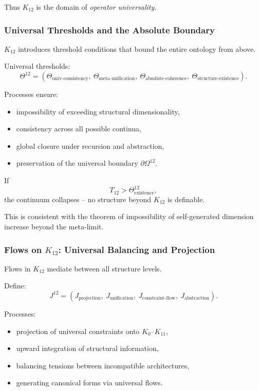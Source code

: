 Thus $K_{12}$ is the domain of \emph{operator universality}.

\subsubsection{Universal Thresholds and the Absolute Boundary}

$K_{12}$ introduces threshold conditions that bound
the entire ontology from above.

Universal thresholds:
\[
\Theta^{12} =
(\Theta_{\text{univ-consistency}},\
 \Theta_{\text{meta-unification}},\
 \Theta_{\text{absolute-coherence}},\
 \Theta_{\text{structure-existence}}).
\]

Processes ensure:
\begin{itemize}
    \item impossibility of exceeding structural dimensionality,
    \item consistency across all possible continua,
    \item global closure under recursion and abstraction,
    \item preservation of the universal boundary $\partial\Omega^{12}$.
\end{itemize}

If
\[
T_{12} > \Theta^{12}_{\text{existence}},
\]
the continuum collapses -- no structure beyond $K_{12}$ is definable.

This is consistent with the theorem of impossibility of
self-generated dimension increase beyond the meta-limit.

\subsubsection{Flows on $K_{12}$: Universal Balancing and Projection}

Flows in $K_{12}$ mediate between all structure levels.

Define:
\[
J^{12} =
(J_{\text{projection}},\ J_{\text{unification}},\
 J_{\text{constraint-flow}},\ J_{\text{abstraction}}).
\]

Processes:
\begin{itemize}
    \item projection of universal constraints onto $K_0$--$K_{11}$,
    \item upward integration of structural information,
    \item balancing tensions between incompatible architectures,
    \item generating canonical forms via universal flows.
\end{itemize}

